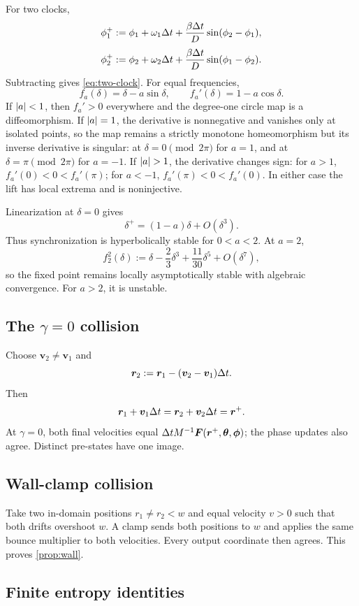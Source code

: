 For two clocks,
\[
\phi_1^+
:=
\phi_1+\omega_1\Delta t
+\frac{\beta\Delta t}{D}\sin(\phi_2-\phi_1),
\]
\[
\phi_2^+
:=
\phi_2+\omega_2\Delta t
+\frac{\beta\Delta t}{D}\sin(\phi_1-\phi_2).
\]
Subtracting gives \cref{eq:two-clock}. For equal frequencies,
\[
f_a(\delta)=\delta-a\sin\delta,
\qquad
f_a'(\delta)=1-a\cos\delta.
\]
If \(\left\lvert a\right\rvert<1\), then \(f_a'>0\) everywhere and the degree-one circle map is a diffeomorphism. If \(\left\lvert a\right\rvert=1\), the derivative is nonnegative and vanishes only at isolated points, so the map remains a strictly monotone homeomorphism but its inverse derivative is singular: at \(\delta=0\pmod{2\pi}\) for \(a=1\), and at \(\delta=\pi\pmod{2\pi}\) for \(a=-1\). If \(\left\lvert a\right\rvert>1\), the derivative changes sign: for \(a>1\), \(f_a'(0)<0<f_a'(\pi)\); for \(a<-1\), \(f_a'(\pi)<0<f_a'(0)\). In either case the lift has local extrema and is noninjective.

Linearization at \(\delta=0\) gives
\[
\delta^+=(1-a)\delta+O(\delta^3).
\]
Thus synchronization is hyperbolically stable for \(0<a<2\). At \(a=2\),
\[
f_2^2(\delta)
:=
\delta-\frac23\delta^3
+\frac{11}{30}\delta^5
+O(\delta^7),
\]
so the fixed point remains locally asymptotically stable with algebraic convergence. For \(a>2\), it is unstable.

\subsection{The \(\gamma=0\) collision}

Choose \(\bm v_2\neq\bm v_1\) and
\[
\bm r_2
:=
\bm r_1-(\bm v_2-\bm v_1)\Delta t.
\]
Then
\[
\bm r_1+\bm v_1\Delta t
=
\bm r_2+\bm v_2\Delta t
=
\bm r^+.
\]
At \(\gamma=0\), both final velocities equal
\(\Delta t M^{-1}\bm F(\bm r^+,\bm\theta,\bm\phi)\); the phase updates also agree. Distinct pre-states have one image.

\subsection{Wall-clamp collision}

Take two in-domain positions \(r_1\neq r_2<w\) and equal velocity \(v>0\) such that both drifts overshoot \(w\). A clamp sends both positions to \(w\) and applies the same bounce multiplier to both velocities. Every output coordinate then agrees. This proves \cref{prop:wall}.

\subsection{Finite entropy identities}

